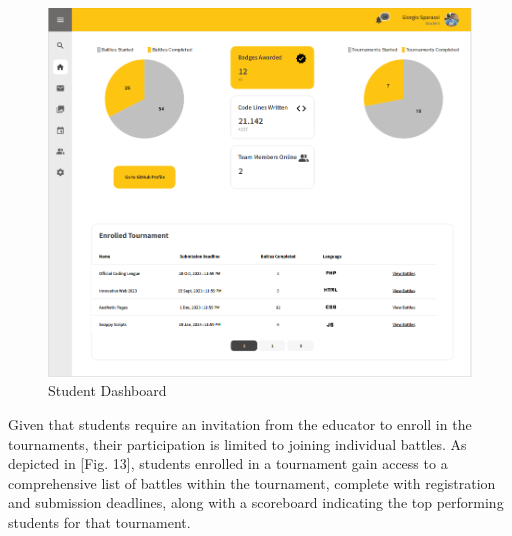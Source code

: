 \documentclass[12pt,oneside,a4paper]{article}
\begin{document}
\begin{figure}[htbp]
    \centering
    \includegraphics[width=1\linewidth]{Images/Interfaces/Student Interfaces/StudentDash.PNG}
    \caption{Student Dashboard}
    \label{fig:enter-label}
\end{figure}

\pagebreak

\begin{flushleft}
Given that students require an invitation from the educator to enroll in the tournaments, their participation is limited to joining individual battles. As depicted in [Fig. 13], students enrolled in a tournament gain access to a comprehensive list of battles within the tournament, complete with registration and submission deadlines, along with a scoreboard indicating the top performing students for that tournament.   
\end{flushleft}
\end{document}
